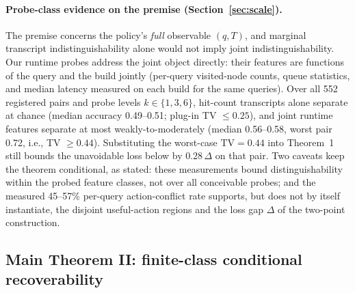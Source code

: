 \documentclass{article}
\newcommand{\TV}{\mathrm{TV}}
\begin{document}
\paragraph{Probe-class evidence on the premise (Section~\ref{sec:scale}).}
The premise concerns the policy's \emph{full} observable $(q,T)$, and marginal transcript indistinguishability
alone would not imply joint indistinguishability. Our runtime probes address the joint object directly: their
features are functions of the query and the build jointly (per-query visited-node counts, queue statistics,
and median latency measured on each build for the same queries). Over all 552 registered pairs and probe
levels $k\in\{1,3,6\}$, hit-count transcripts alone separate at chance (median accuracy 0.49--0.51;
plug-in TV $\le0.25$), and joint runtime features separate at most weakly-to-moderately (median 0.56--0.58,
worst pair 0.72, i.e., TV $\ge0.44$). Substituting the worst-case $\TV=0.44$ into Theorem~1 still bounds
the unavoidable loss below by $0.28\,\Delta$ on that pair. Two caveats keep the theorem conditional, as
stated: these measurements bound distinguishability within the probed feature classes, not over all
conceivable probes; and the measured 45--57\% per-query action-conflict rate supports, but does not by
itself instantiate, the disjoint useful-action regions and the loss gap $\Delta$ of the two-point
construction.

\subsection{Main Theorem II: finite-class conditional recoverability}
\end{document}
